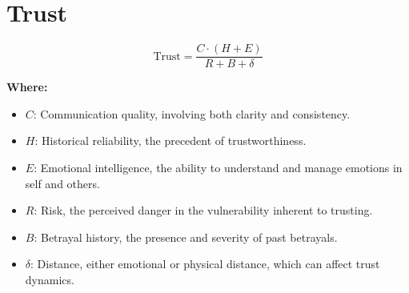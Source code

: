\chapter{Trust}

\begin{equation}
\text{Trust} = \frac{C \cdot (H + E)}{R + B + \delta}
\end{equation}

\textbf{Where:}

\begin{itemize}
    \item $C$: Communication quality, involving both clarity and consistency.
    \item $H$: Historical reliability, the precedent of trustworthiness.
    \item $E$: Emotional intelligence, the ability to understand and manage emotions in self and others.
    \item $R$: Risk, the perceived danger in the vulnerability inherent to trusting.
    \item $B$: Betrayal history, the presence and severity of past betrayals.
    \item $\delta$: Distance, either emotional or physical distance, which can affect trust dynamics.
\end{itemize}